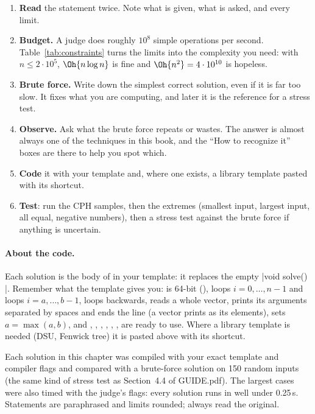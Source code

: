 \begin{enumerate}
  \item \textbf{Read} the statement twice. Note what is given, what is asked, and every limit.
  \item \textbf{Budget.} A judge does roughly $10^8$ simple operations per second. Table~\ref{tab:constraints} turns the limits
        into the complexity you need: with $n \le 2\cdot 10^5$, $\Oh{n\log n}$ is fine and $\Oh{n^2} = 4\cdot10^{10}$ is
        hopeless.
  \item \textbf{Brute force.} Write down the simplest correct solution, even if it is far too slow. It fixes what you are
        computing, and later it is the reference for a stress test.
  \item \textbf{Observe.} Ask what the brute force repeats or wastes. The answer is almost always one of the techniques in
        this book, and the ``How to recognize it'' boxes are there to help you spot which.
  \item \textbf{Code} it with your template and, where one exists, a library template pasted with its shortcut.
  \item \textbf{Test}: run the CPH samples, then the extremes (smallest input, largest input, all equal, negative numbers),
        then a stress test against the brute force if anything is uncertain.
\end{enumerate}

\paragraph{About the code.} Each solution is the body of  in your template: it replaces the empty
\cc|void solve() {}|. Remember what the template gives you:  is 64-bit (), 
loops $i = 0, \dots, n-1$ and  loops $i = a, \dots, b-1$,  loops backwards,  reads a
whole vector,  prints its arguments separated by spaces and ends the line (a vector prints as its elements),
 sets $a = \max(a, b)$, and , , , , , ,  are ready
to use. Where a library template is needed (DSU, Fenwick tree) it is pasted above  with its shortcut.

\begin{fact}
Each solution in this chapter was compiled with your exact template and compiler flags and compared with a brute-force
solution on 150 random inputs (the same kind of stress test as Section~4.4 of GUIDE.pdf). The largest cases were also timed
with the judge's flags: every solution runs in well under 0.25\,s. Statements are paraphrased and limits rounded; always read
the original.
\end{fact}

